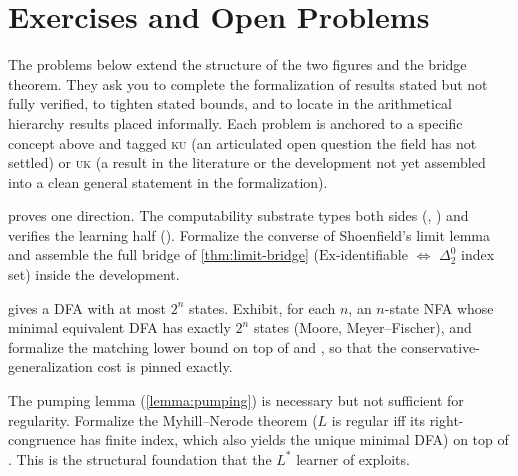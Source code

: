 \section{Exercises and Open Problems}
\label{sec:ch3-open}

The problems below extend the structure of the two figures and the bridge theorem. They ask you to complete the formalization of results stated but not fully verified, to tighten stated bounds, and to locate in the arithmetical hierarchy results placed informally. Each problem is anchored to a specific concept above and tagged \textsc{ku} (an articulated open question the field has not settled) or \textsc{uk} (a result in the literature or the development not yet assembled into a clean general statement in the formalization).

\begin{openprob}
\label{op:bridge-formal}
 proves one direction. The computability substrate types both sides (, ) and verifies the learning half (). Formalize the converse of Shoenfield's limit lemma and assemble the full bridge of \cref{thm:limit-bridge} ($\mathrm{Ex}$-identifiable $\Leftrightarrow$ $\Delta^0_2$ index set) inside the development.
\end{openprob}

\begin{openprob}
\label{op:subset-tight}
 gives a DFA with at most $2^n$ states. Exhibit, for each $n$, an $n$-state NFA whose minimal equivalent DFA has exactly $2^n$ states (Moore, Meyer--Fischer), and formalize the matching lower bound on top of  and , so that the conservative-generalization cost is pinned exactly.
\end{openprob}

\begin{openprob}
\label{op:myhill-nerode}
The pumping lemma (\cref{lemma:pumping}) is necessary but not sufficient for regularity. Formalize the Myhill--Nerode theorem ($L$ is regular iff its right-congruence has finite index, which also yields the unique minimal DFA) on top of . This is the structural foundation that the $L^\ast$ learner of  exploits.
\end{openprob}

